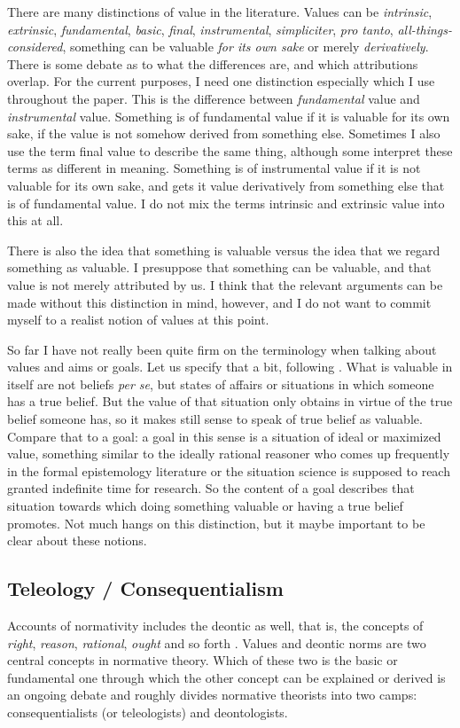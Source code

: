 \documentclass[12pt,numbers=noenddot]{scrartcl}
\begin{document}
There are many distinctions of value in the literature. Values can be \emph{intrinsic}, \emph{extrinsic}, \emph{fundamental}, \emph{basic}, \emph{final}, \emph{instrumental}, \emph{simpliciter}, \emph{pro tanto}, \emph{all-things-considered}, something can be valuable \emph{for its own sake} or merely \emph{derivatively}. There is some debate as to what the differences are, and which attributions overlap. For the current purposes, I need one distinction especially which I use throughout the paper. This is the difference between \emph{fundamental} value and \emph{instrumental} value. Something is of fundamental value if it is valuable for its own sake, if the value is not somehow derived from something else. Sometimes I also use the term final value to describe the same thing, although some interpret these terms as different in meaning. Something is of instrumental value if it is not valuable for its own sake, and gets it value derivatively from something else that is of fundamental value. I do not mix the terms intrinsic and extrinsic value into this at all.

There is also the idea that something is valuable versus the idea that we regard something as valuable. I presuppose that something can be valuable, and that value is not merely attributed by us. I think that the relevant arguments can be made without this distinction in mind, however, and I do not want to commit myself to a realist notion of values at this point.

So far I have not really been quite firm on the terminology when talking about values and aims or goals. Let us specify that a bit, following \textcite[344f.]{Berker2013-BERETA-2}. What is valuable in itself are not beliefs \emph{per se}, but states of affairs or situations in which someone has a true belief. But the value of that situation only obtains in virtue of the true belief someone has, so it makes still sense to speak of true belief as valuable. Compare that to a goal: a goal in this sense is a situation of ideal or maximized value, something similar to the ideally rational reasoner who comes up frequently in the formal epistemology literature or the situation science is supposed to reach granted indefinite time for research. So the content of a goal describes that situation towards which doing something valuable or having a true belief promotes. Not much hangs on this distinction, but it maybe important to be clear about these notions.

\subsection{ Teleology / Consequentialism} \label{subsec: teleology}
 Accounts of normativity includes the deontic as well, that is, the concepts of \emph{right}, \emph{reason}, \emph{rational}, \emph{ought} and so forth \autocite[21]{sep-value-theory}. Values and deontic norms are two central concepts in normative theory. Which of these two is the basic or fundamental one through which the other concept can be explained or derived is an ongoing debate and roughly divides normative theorists into two camps: consequentialists (or teleologists) and deontologists. 
\end{document}
